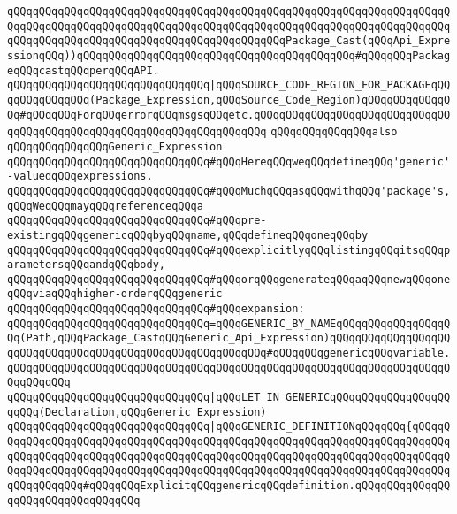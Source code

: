\verb|qQQqqQQqqQQqqQQqqQQqqQQqqQQqqQQqqQQqqQQqqQQqqQQqqQQqqQQqqQQqqQQqqQQqqQQqqQQqqQQqqQQqqQQqqQQqqQQqqQQqqQQqqQQqqQQqqQQqqQQqqQQqqQQqqQQqqQQqqQQqqQQqqQQqqQQqqQQqqQQqqQQqqQQqqQQqqQQqqQQqqQQqPackage_Cast(qQQqApi_ExpressionqQQq))qQQqqQQqqQQqqQQqqQQqqQQqqQQqqQQqqQQqqQQqqQQq#qQQqqQQqPackageqQQqcastqQQqperqQQqAPI.|\newline
\verb|qQQqqQQqqQQqqQQqqQQqqQQqqQQqqQQq|\verb#|qQQqSOURCE_CODE_REGION_FOR_PACKAGEqQQqqQQqqQQqqQQq(Package_Expression,qQQqSource_Code_Region)qQQqqQQqqQQqqQQq#\verb|#qQQqqQQqForqQQqerrorqQQqmsgsqQQqetc.qQQqqQQqqQQqqQQqqQQqqQQqqQQqqQQqqQQqqQQqqQQqqQQqqQQqqQQqqQQqqQQqqQQqqQQq|\newline
\newline
\newline
\newline
\verb|qQQqqQQqqQQqqQQqalso|\newline
\verb|qQQqqQQqqQQqqQQqGeneric_Expression|\newline
\newline
\verb|qQQqqQQqqQQqqQQqqQQqqQQqqQQqqQQq#qQQqHereqQQqweqQQqdefineqQQq'generic'-valuedqQQqexpressions.|\newline
\verb|qQQqqQQqqQQqqQQqqQQqqQQqqQQqqQQq#qQQqMuchqQQqasqQQqwithqQQq'package's,qQQqWeqQQqmayqQQqreferenceqQQqa|\newline
\verb|qQQqqQQqqQQqqQQqqQQqqQQqqQQqqQQq#qQQqpre-existingqQQqgenericqQQqbyqQQqname,qQQqdefineqQQqoneqQQqby|\newline
\verb|qQQqqQQqqQQqqQQqqQQqqQQqqQQqqQQq#qQQqexplicitlyqQQqlistingqQQqitsqQQqparametersqQQqandqQQqbody,|\newline
\verb|qQQqqQQqqQQqqQQqqQQqqQQqqQQqqQQq#qQQqorqQQqgenerateqQQqaqQQqnewqQQqoneqQQqviaqQQqhigher-orderqQQqgeneric|\newline
\verb|qQQqqQQqqQQqqQQqqQQqqQQqqQQqqQQq#qQQqexpansion:|\newline
\newline
\newline
\verb|qQQqqQQqqQQqqQQqqQQqqQQqqQQqqQQq=qQQqGENERIC_BY_NAMEqQQqqQQqqQQqqQQqqQQq(Path,qQQqPackage_CastqQQqGeneric_Api_Expression)qQQqqQQqqQQqqQQqqQQqqQQqqQQqqQQqqQQqqQQqqQQqqQQqqQQqqQQqqQQq#qQQqqQQqgenericqQQqvariable.qQQqqQQqqQQqqQQqqQQqqQQqqQQqqQQqqQQqqQQqqQQqqQQqqQQqqQQqqQQqqQQqqQQqqQQqqQQqqQQq|\newline
\verb|qQQqqQQqqQQqqQQqqQQqqQQqqQQqqQQq|\verb#|qQQqLET_IN_GENERICqQQqqQQqqQQqqQQqqQQqqQQq(Declaration,qQQqGeneric_Expression)#\newline
\verb|qQQqqQQqqQQqqQQqqQQqqQQqqQQqqQQq|\verb#|qQQqGENERIC_DEFINITIONqQQqqQQq{qQQqqQQqqQQqqQQqqQQqqQQqqQQqqQQqqQQqqQQqqQQqqQQqqQQqqQQqqQQqqQQqqQQqqQQqqQQqqQQqqQQqqQQqqQQqqQQqqQQqqQQqqQQqqQQqqQQqqQQqqQQqqQQqqQQqqQQqqQQqqQQqqQQqqQQqqQQqqQQqqQQqqQQqqQQqqQQqqQQqqQQqqQQqqQQqqQQqqQQqqQQqqQQqqQQqqQQqqQQqqQQqqQQq#\verb|#qQQqqQQqExplicitqQQqgenericqQQqdefinition.qQQqqQQqqQQqqQQqqQQqqQQqqQQqqQQqqQQq|\newline
